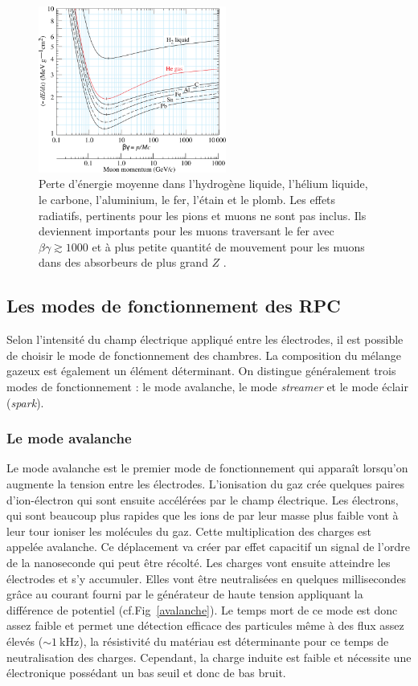 \begin{figure}[ht!]
	\centering
	\includegraphics[width=0.55\textwidth]{RPC/energylost.png}
	\captionsetup{type=subfigure}\caption{Perte d'énergie moyenne dans l'hydrogène liquide, l'hélium liquide, le carbone, l'aluminium, le fer, l'étain et le plomb. Les effets radiatifs, pertinents pour les pions et muons ne sont pas inclus. Ils deviennent importants pour les muons traversant le fer avec $\beta\gamma\gtrsim1000$ et à plus petite quantité de mouvement pour les muons dans des absorbeurs de plus grand $Z$ \cite{Olive:2016xmw}.}
	\label{mat}
\end{figure}

\subsection{Les modes de fonctionnement des RPC}

Selon l'intensité du champ électrique appliqué entre les électrodes, il est possible de choisir le mode de fonctionnement des chambres. La composition du mélange gazeux est également un élément déterminant. On distingue généralement trois modes de fonctionnement : le mode avalanche, le mode \textit{streamer} et le mode éclair (\textit{spark}).

\subsubsection{Le mode avalanche}

Le mode avalanche est le premier mode de fonctionnement qui apparaît lorsqu'on augmente la tension entre les électrodes. L'ionisation du gaz crée quelques paires d'ion-électron qui sont ensuite accélérées par le champ électrique. Les électrons, qui sont beaucoup plus rapides que les ions de par leur masse plus faible vont à leur tour ioniser les molécules du gaz. Cette multiplication des charges est appelée avalanche. Ce déplacement va créer par effet capacitif un signal de l'ordre de la nanoseconde qui peut être récolté. Les charges vont ensuite atteindre les électrodes et s'y accumuler. Elles vont être neutralisées en quelques millisecondes grâce au courant fourni par le générateur de haute tension appliquant la différence de potentiel (cf.Fig~\ref{avalanche}). Le temps mort de ce mode est donc assez faible et permet une détection efficace des particules même à des flux assez élevés ($\sim\SI{1}{\kilo\hertz}$), la résistivité du matériau est déterminante pour ce temps de neutralisation des charges. Cependant, la charge induite est faible et nécessite une électronique possédant un bas seuil et donc de bas bruit.

